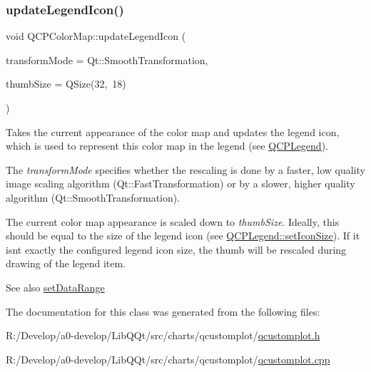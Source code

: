 \mbox{\label{class_q_c_p_color_map_a5d8158b62d55fcfeaabcb68ce0083e87}} 
\subsubsection{\texorpdfstring{update\+Legend\+Icon()}{updateLegendIcon()}}
{\footnotesize\ttfamily void Q\+C\+P\+Color\+Map\+::update\+Legend\+Icon (\begin{DoxyParamCaption}\item[{Qt\+::\+Transformation\+Mode}]{transform\+Mode = {\ttfamily Qt\+:\+:SmoothTransformation},  }\item[{const Q\+Size \&}]{thumb\+Size = {\ttfamily QSize(32,~18)} }\end{DoxyParamCaption})}

Takes the current appearance of the color map and updates the legend icon, which is used to represent this color map in the legend (see \mbox{\hyperlink{class_q_c_p_legend}{Q\+C\+P\+Legend}}).

The {\itshape transform\+Mode} specifies whether the rescaling is done by a faster, low quality image scaling algorithm (Qt\+::\+Fast\+Transformation) or by a slower, higher quality algorithm (Qt\+::\+Smooth\+Transformation).

The current color map appearance is scaled down to {\itshape thumb\+Size}. Ideally, this should be equal to the size of the legend icon (see \mbox{\hyperlink{class_q_c_p_legend_a8b0740cce488bf7010da6beda6898984}{Q\+C\+P\+Legend\+::set\+Icon\+Size}}). If it isn\textquotesingle{}t exactly the configured legend icon size, the thumb will be rescaled during drawing of the legend item.

\begin{DoxySeeAlso}{See also}
\mbox{\hyperlink{class_q_c_p_color_map_a980b42837821159786a85b4b7dcb8774}{set\+Data\+Range}} 
\end{DoxySeeAlso}


The documentation for this class was generated from the following files\+:\begin{DoxyCompactItemize}
\item 
R\+:/\+Develop/a0-\/develop/\+Lib\+Q\+Qt/src/charts/qcustomplot/\mbox{\hyperlink{qcustomplot_8h}{qcustomplot.\+h}}\item 
R\+:/\+Develop/a0-\/develop/\+Lib\+Q\+Qt/src/charts/qcustomplot/\mbox{\hyperlink{qcustomplot_8cpp}{qcustomplot.\+cpp}}\end{DoxyCompactItemize}
